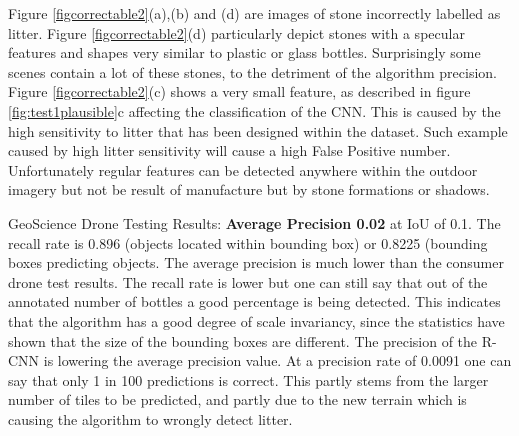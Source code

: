 \documentclass{IEEEtran}
\begin{document}
\begin{enumerate}
Figure \ref{figcorrectable2}(a),(b) and (d) are images of stone incorrectly labelled as litter. Figure \ref{figcorrectable2}(d) particularly depict stones with a specular features and shapes very similar to plastic or glass bottles. Surprisingly some scenes contain a lot of these stones, to the detriment of the algorithm precision. Figure \ref{figcorrectable2}(c) shows a very small feature, as described  in figure \ref{fig:test1plausible}c affecting the classification of the CNN. This is caused by the high sensitivity to litter that has been designed within the dataset. Such example caused by high litter sensitivity will cause a high False Positive number. Unfortunately regular features can be detected anywhere within the outdoor imagery but not be result of manufacture but by stone formations or shadows. \newline
\end{enumerate}


GeoScience Drone Testing Results: \textbf{Average Precision 0.02} at IoU of 0.1. The recall rate is 0.896 (objects located within bounding box) or 0.8225 (bounding boxes predicting objects. The average precision is much lower than the consumer drone test results. The recall rate is lower but one can still say that out of the annotated number of bottles a good percentage is being detected. This indicates that the algorithm has a good degree of scale invariancy, since the statistics have shown that the size of the bounding boxes are different. The precision of the R-CNN is lowering the average precision value. At a precision rate of 0.0091 one can say that only 1 in 100 predictions is correct. This partly stems from the larger number of tiles to be predicted, and partly due to the new terrain which is causing the algorithm to wrongly detect litter.\newline 
\end{document}

